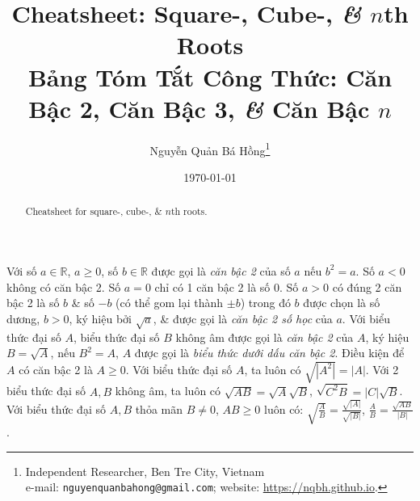 \documentclass{article}
\title{Cheatsheet: Square-, Cube-, \textit{\&} $n$th Roots\\Bảng Tóm Tắt Công Thức: Căn Bậc 2, Căn Bậc 3, \textit{\&} Căn Bậc $n$}
\author{Nguyễn Quản Bá Hồng\footnote{Independent Researcher, Ben Tre City, Vietnam\\e-mail: \texttt{nguyenquanbahong@gmail.com}; website: \url{https://nqbh.github.io}.}}
\date{\today}
\begin{document}
\maketitle
\begin{abstract}
	Cheatsheet for square-, cube-, \& $n$th roots.
\end{abstract}
\tableofcontents


 Với số $a\in\mathbb{R}$, $a\ge0$, số $b\in\mathbb{R}$ được gọi là \textit{căn bậc 2} của số $a$ nếu $b^2 = a$.  Số $a < 0$ không có căn bậc 2. Số $a = 0$ chỉ có 1 căn bậc 2 là số 0. Số $a > 0$ có đúng 2 căn bậc 2 là số $b$ \& số $-b$ (có thể gom lại thành $\pm b$) trong đó $b$ được chọn là số dương, $b > 0$, ký hiệu bởi $\sqrt{a}$, \& được gọi là \textit{căn bậc 2 số học} của $a$.  Với biểu thức đại số $A$, biểu thức đại số $B$ không âm được gọi là \textit{căn bậc 2} của $A$, ký hiệu $B = \sqrt{A}$, nếu $B^2 = A$, $A$ được gọi là \textit{biểu thức dưới dấu căn bậc 2}.  Điều kiện để $A$ có căn bậc 2 là $A\ge0$.  Với biểu thức đại số $A$, ta luôn có $\sqrt{|A^2|} = |A|$.  Với 2 biểu thức đại số $A,B$ không âm, ta luôn có $\sqrt{AB} = \sqrt{A}\sqrt{B}$, $\sqrt{C^2B} = |C|\sqrt{B}$.  Với biểu thức đại số $A,B$ thỏa mãn $B\ne0$, $AB\ge0$ luôn có: $\sqrt{\frac{A}{B}} = \frac{\sqrt{|A|}}{\sqrt{|B|}}$, $\frac{A}{B} = \frac{\sqrt{AB}}{|B|}$.


\printbibliography[heading=bibintoc]
\end{document}
